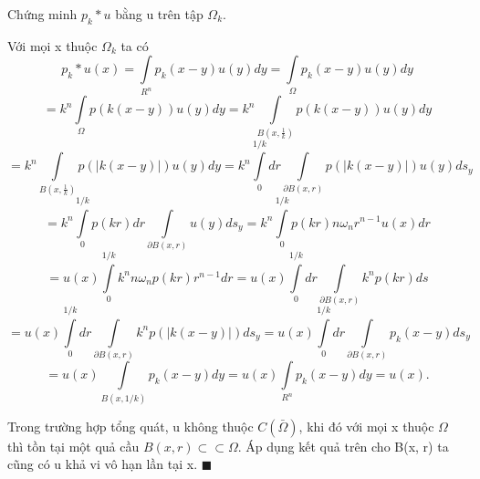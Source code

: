 Chứng minh $p_k*u$ bằng u trên tập $\Omega_k$.

Với mọi x thuộc $\Omega_k$ ta có 
\[
 p_k  * u(x) = \int\limits_{R^n } {p_k (x - y)u(y)dy}  
  = \int\limits_\Omega  {p_k (x - y)u(y)dy}\]
 \[ = k^n \int\limits_\Omega  {p(k(x - y))u(y)dy}  
  = k^n \int\limits_{B(x,\frac{1}{k})} {p(k(x - y))u(y)dy}  \]
 \[ = k^n \int\limits_{B(x,\frac{1}{k})} {p(|k(x - y)|)u(y)dy} 
  = k^n \int\limits_0^{1/k} {dr\int\limits_{\partial B(x,r)} {p(|k(x - y)|)u(y)ds_y } }\]
 \[ = k^n \int\limits_0^{1/k} {p(kr)dr\int\limits_{\partial B(x,r)} {u(y)ds_y } }  
  = k^n \int\limits_0^{1/k} {p(kr)n} \omega _n r^{n - 1} u(x)dr \]
\[  = u(x)\int\limits_0^{1/k} {k^n n\omega _n p(kr)} r^{n - 1} dr 
  = u(x)\int\limits_0^{1/k} {dr\int\limits_{\partial B(x,r)} {k^n p(kr)} } ds \]
 \[ = u(x)\int\limits_0^{1/k} {dr\int\limits_{\partial B(x,r)} {k^n p(|k(x - y)|)} } ds_y 
  = u(x)\int\limits_0^{1/k} {dr\int\limits_{\partial B(x,r)} {p_k (x - y)} } ds_y  \]
\[  = u(x)\int\limits_{B(x,1/k)} {p_k (x - y)dy}  
  = u(x)\int\limits_{R^n } {p_k (x - y)dy}  
  = u(x). \]

Trong trường hợp tổng quát, u không thuộc $C(\bar \Omega)$, khi đó với mọi x thuộc $\Omega$ thì tồn tại một quả cầu $B(x, r) \subset \subset \Omega$. Áp dụng kết quả trên cho B(x, r) ta cũng có u khả vi vô hạn lần tại x. $\blacksquare$
